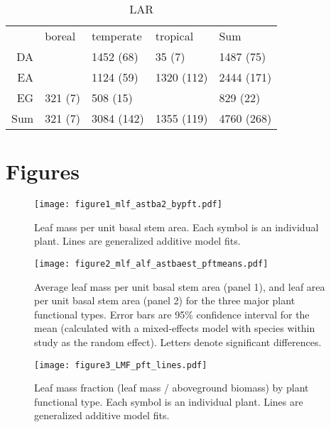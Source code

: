 \documentclass[a4paper]{article}\usepackage[]{graphicx}\usepackage[]{color}
\begin{document}
\begin{table}[ht]
\centering
\caption{LAR} 
\begin{tabular}{rlll|l}
  & boreal & temperate & tropical & Sum \\ 
 DA &  & 1452 (68) & 35 (7) & 1487 (75) \\ 
   \hline
EA &  & 1124 (59) & 1320 (112) & 2444 (171) \\ 
  EG & 321 (7) & 508 (15) &  & 829 (22) \\ 
   \hline
Sum & 321 (7) & 3084 (142) & 1355 (119) & 4760 (268) \\ 
  \end{tabular}
\end{table}







\clearpage
\section{Figures}


\begin{figure}[h!]
    \centering
    \texttt{[image: figure1\_mlf\_astba2\_bypft.pdf]}
    \caption{Leaf mass per unit basal stem area. Each symbol is an individual plant. Lines are generalized additive model fits.}
    \label{fig:figure1}
\end{figure}

\begin{figure}[h!]
    \centering
    \texttt{[image: figure2\_mlf\_alf\_astbaest\_pftmeans.pdf]}
    \caption{Average leaf mass per unit basal stem area (panel 1), and leaf area per unit basal stem area (panel 2) for the three major plant functional types. Error bars are 95\% confidence interval for the mean (calculated with a mixed-effects model with species within study as the random effect). Letters denote significant differences. }
    \label{fig:figure2}
\end{figure}


\begin{figure}[h!]
    \centering
    \texttt{[image: figure3\_LMF\_pft\_lines.pdf]}
    \caption{Leaf mass fraction (leaf mass / aboveground biomass) by plant functional type. Each symbol is an individual plant. Lines are generalized additive model fits.}
    \label{fig:figure3}
\end{figure}
\end{document}
